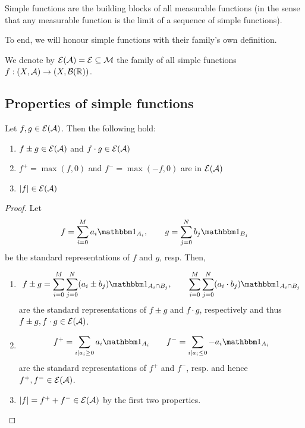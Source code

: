 Simple functions are the building blocks of all measurable functions (in the sense that any measurable function is the limit of a sequence of simple functions).

To end, we will honour simple functions with their family's own definition.

\begin{dfn}
	We denote by $\mathcal{E}(\mathcal{A}) = \mathcal{E} \subseteq \mathcal{M}$ the family of all simple functions $f:(X,\mathcal{A}) \to (X, \mathcal{B}(\mathbb{R}))$.
\end{dfn}

\subsection{Properties of simple functions}

\begin{thm}
	\label{thm:prop-simple-functions}
	Let $f, g \in \mathcal{E}(\mathcal{A})$. Then the following hold:
	\begin{enumerate}
		\item $f\pm g \in \mathcal{E}(\mathcal{A})$ and $f\cdot g \in \mathcal{E}(\mathcal{A})$
		\item $f^+ = \max(f, 0)$ and $f^- = \max (-f, 0)$ are in $\mathcal{E}(\mathcal{A})$
		\item $\left\vert{f}\right\vert \in \mathcal{E}(\mathcal{A})$
	\end{enumerate}
\end{thm}

\begin{proof}Let
	\begin{align*}
		f = \sum_{i = 0}^M a_i \ind_{A_i},\qquad g = \sum_{j = 0}^N b_j \ind_{B_j}
	\end{align*}
	be the standard representations of $f$ and $g$, resp. Then,
	\begin{enumerate}
		\item
		\begin{align*}
			f \pm g = \sum_{i=0}^{M}\sum_{j=0}^{N} (a_i \pm b_j)\ind_{A_i \cap B_j},\qquad \sum_{i=0}^{M}\sum_{j=0}^{N} (a_i \cdot b_j)\ind_{A_i \cap B_j}
		\end{align*}
		are the standard representations of $f\pm g$ and $f \cdot g$, respectively and thus $f\pm g , f\cdot g \in \mathcal{E}(\mathcal{A})$.
		
		\item
		\begin{align*}
			f^+ = \sum_{i \mid a_i \geq 0} a_i \ind_{A_i} \qquad f^- = \sum_{i \mid a_i \leq 0} - a_i \ind_{A_i}
		\end{align*}
		are the standard representations of $f^+$ and $f^-$, resp. and hence $f^+, f^- \in \mathcal{E}(\mathcal{A})$.
		
		\item $\left\vert{f}\right\vert = f^+ + f^- \in \mathcal{E}(\mathcal{A})$ by the first two properties.
	\end{enumerate}
\end{proof}

